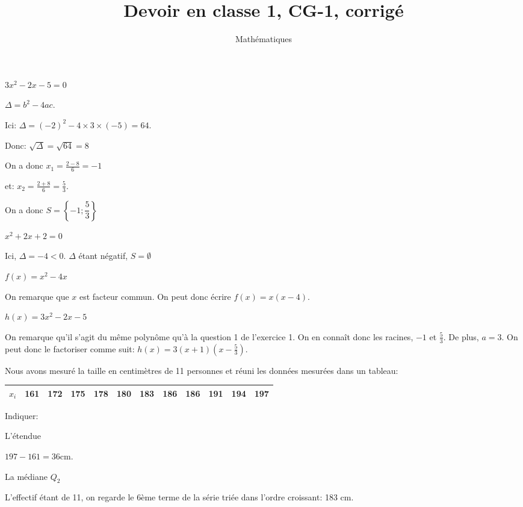 \documentclass[a4paper,12pt]{scrartcl}
\date{}
\title{Devoir en classe 1, CG-1, corrigé}
\author{Mathématiques}
\begin{document}
\maketitle


\question{}
$3x^2-2x-5=0$

$\Delta = b^2-4ac$.

Ici: $\Delta = (-2)^2-4 \times 3 \times (-5) = 64$.

Donc: $\sqrt{\Delta} = \sqrt{64} = 8$

On a donc $x_1 = \frac{2-8}{6} = -1$

et: $x_2 = \frac{2+8}{6} = \frac{5}{3}$.

On a donc $S = \left\lbrace -1 ; \dfrac{5}{3} \right\rbrace$

\question{}
$x^2+2x+2=0$

Ici, $\Delta = -4 < 0$. $\Delta$ étant négatif, $S = \emptyset$


\question{}
$f(x) = x^2 - 4x$

On remarque que $x$ est facteur commun. On peut donc écrire $f(x) = x(x-4)$.

\question{}
$h(x) = 3x^2-2x-5$

On remarque qu'il s'agit du même polynôme qu'à la question 1 de l'exercice 1. On en connaît donc les racines, $-1$ et $\frac{5}{3}$. De plus, $a = 3$. On peut donc le factoriser comme suit: $h(x) = 3(x+1)\left(x - \frac{5}{3} \right)$.


Nous avons mesuré la taille en centimètres de 11 personnes et réuni les données mesurées dans un tableau:

\begin{center}
\begin{tabular}{|l|l|l|l|l|l|l|l|l|l|l|l|}
\hline
$x_i$ & 161 & 172 & 175 & 178 & 180 & 183 & 186 & 186 & 191 & 194 & 197 \\ \hline
\end{tabular}
\end{center}

Indiquer:

\question{}
L'étendue

$197 - 161 = 36$cm.

\question{}
La médiane $Q_2$

L'effectif étant de 11, on regarde le 6ème terme de la série triée dans l'ordre croissant: 183 cm.
\end{document}

